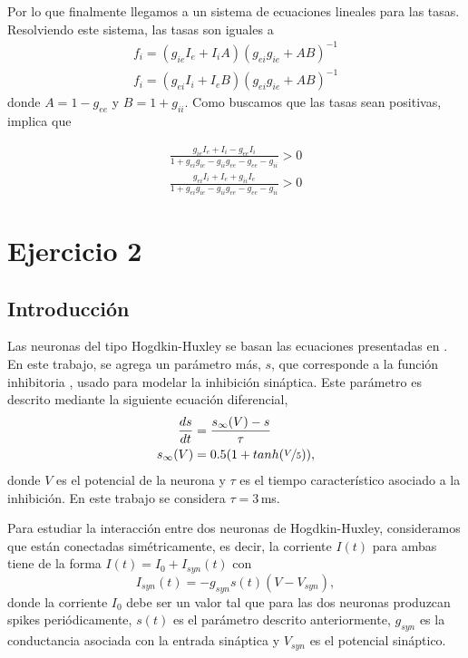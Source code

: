 Por lo que finalmente llegamos a un sistema de ecuaciones lineales para las tasas. Resolviendo este sistema, las tasas son iguales a 
\begin{align}
     f_i = (g_{ie}I_e + I_iA)(g_{ei}g_{ie}+ AB)^{-1}\\
     f_i = (g_{ei}I_i + I_eB)(g_{ei}g_{ie}+ AB)^{-1} 
\end{align}
donde $A= 1 - g_{ee}$ y $B=1+g_{ii}$. Como buscamos que las tasas sean positivas, implica que 

\begin{align}
     \frac{g_{ie}I_e + I_i -g_{ee}I_i }{1+g_{ei}g_{ie} - g_{ii}g_{ee} -g_{ee}-g_{ii}} > 0\\
     \frac{g_{ei}I_i + I_e +g_{ii}I_e }{1+g_{ei}g_{ie} - g_{ii}g_{ee} -g_{ee}-g_{ii}} > 0 
\end{align}


\section*{Ejercicio 2}

\subsection{Introducción}

Las neuronas del tipo Hogdkin-Huxley se basan las ecuaciones presentadas en \cite{HH}. En este trabajo, se agrega un parámetro más, $s$, que corresponde a la función inhibitoria \cite{syn}, usado para modelar la inhibición sináptica. Este parámetro es descrito mediante la siguiente ecuación diferencial,
\begin{align}
    \frac{ds}{dt}&= \frac{s_\infty(V) - s}{\tau}\\
    s_\infty(V)&= 0.5(1+tanh(\nicefrac{V}{5})),
\end{align}
donde $V$ es el potencial de  la neurona y $\tau$ es el tiempo característico asociado a la inhibición. En este trabajo se considera  $\tau = 3\,$ms.

Para estudiar la interacción entre dos neuronas de Hogdkin-Huxley, consideramos que están conectadas simétricamente, es decir, la corriente $I(t)$ para ambas tiene de la forma
$I(t) = I_0 + I_{syn}(t) $ con 
\begin{equation}
     I_{syn}(t)      = -g_{syn}s(t)(V-V_{syn}),
 \end{equation} 
donde la corriente $I_0$ debe ser un valor tal que para las dos neuronas produzcan spikes periódicamente, $s(t)$ es el parámetro descrito anteriormente, $g_{syn}$ es la conductancia asociada con la entrada sináptica y $V_{syn}$ es el potencial sináptico.


